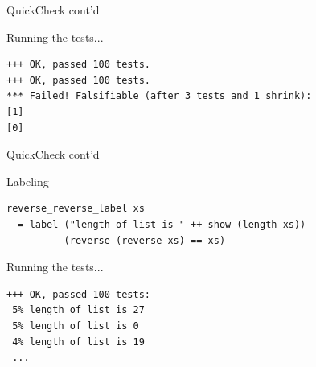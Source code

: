 \documentclass{beamer} %
\begin{document}
\begin{frame}[fragile]{QuickCheck cont'd}
\begin{block}{Running the tests...}
\begin{footnotesize}
\begin{verbatim}
+++ OK, passed 100 tests.
+++ OK, passed 100 tests.
*** Failed! Falsifiable (after 3 tests and 1 shrink):     
[1]
[0]
\end{verbatim}
\end{footnotesize}
\end{block}
\end{frame}

\begin{frame}[fragile]{QuickCheck cont'd}
\begin{block}{Labeling}
\begin{verbatim}
reverse_reverse_label xs  
  = label ("length of list is " ++ show (length xs)) 
          (reverse (reverse xs) == xs)
\end{verbatim}
\end{block}

\begin{block}{Running the tests...}
\begin{footnotesize}
\begin{verbatim}
+++ OK, passed 100 tests:
 5% length of list is 27
 5% length of list is 0
 4% length of list is 19
 ...
\end{verbatim}
\end{footnotesize}
\end{block}
\end{frame}

%
\end{document}
